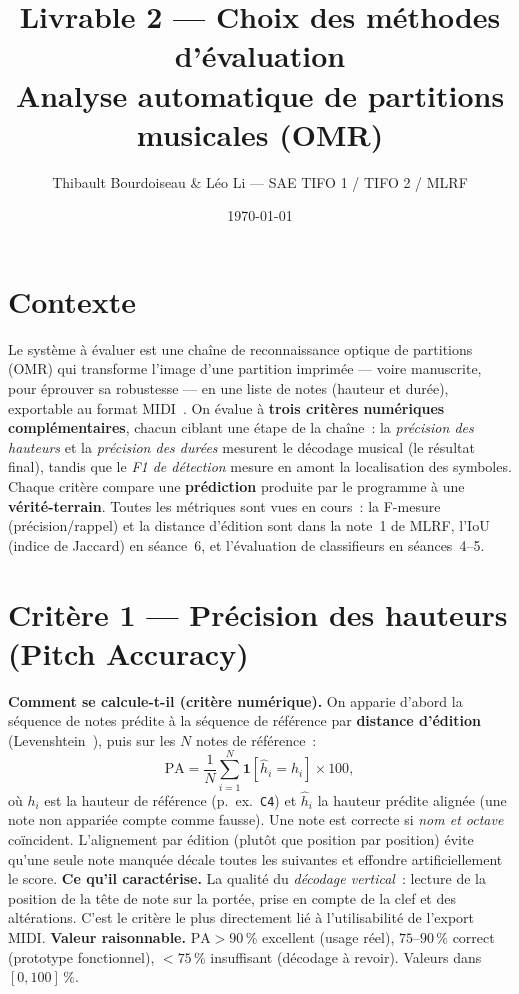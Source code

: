 \documentclass[11pt,a4paper]{article}
\title{\vspace{-1.2cm}\textbf{Livrable 2 --- Choix des méthodes d'évaluation\\[2pt]
\large Analyse automatique de partitions musicales (OMR)}}
\author{\normalsize Thibault Bourdoiseau \& Léo Li --- SAE TIFO 1 / TIFO 2 / MLRF}
\date{\vspace{-8pt}\small \today}
\begin{document}
\maketitle
\vspace{-10pt}

\section{Contexte}
Le système à évaluer est une chaîne de reconnaissance optique de partitions (OMR) qui transforme l'image
d'une partition imprimée --- voire manuscrite, pour éprouver sa robustesse --- en une liste de notes
(hauteur et durée), exportable au format MIDI~\cite{calvo2020,rebelo2012}. On évalue à \textbf{trois critères numériques complémentaires}, chacun
ciblant une étape de la chaîne~: la \emph{précision des hauteurs} et la \emph{précision des durées} mesurent
le décodage musical (le résultat final), tandis que le \emph{F1 de détection} mesure en amont la localisation
des symboles. Chaque critère compare une \textbf{prédiction} produite par le programme à une
\textbf{vérité-terrain}. Toutes les métriques sont vues en cours~: la F-mesure (précision/rappel) et la
distance d'édition sont dans la note~1 de MLRF, l'IoU (indice de Jaccard) en séance~6, et l'évaluation de
classifieurs en séances~4--5.

\section{Critère 1 --- Précision des hauteurs (Pitch Accuracy)}
\textbf{Comment se calcule-t-il (critère numérique).} On apparie d'abord la séquence de notes prédite à la
séquence de référence par \textbf{distance d'édition} (Levenshtein~\cite{levenshtein1966}), puis sur les
$N$ notes de référence~:
\[
\mathrm{PA} = \frac{1}{N}\sum_{i=1}^{N}\mathbf{1}\!\left[\hat h_i = h_i\right]\times 100,
\]
où $h_i$ est la hauteur de référence (p.~ex.\ \texttt{C4}) et $\hat h_i$ la hauteur prédite alignée (une note
non appariée compte comme fausse). Une note est correcte si \emph{nom et octave} coïncident. L'alignement par
édition (plutôt que position par position) évite qu'une seule note manquée décale toutes les suivantes et
effondre artificiellement le score.
\textbf{Ce qu'il caractérise.} La qualité du \emph{décodage vertical}~: lecture de la position de la tête de
note sur la portée, prise en compte de la clef et des altérations. C'est le critère le plus directement lié à
l'utilisabilité de l'export MIDI.
\textbf{Valeur raisonnable.} $\mathrm{PA}>90\,\%$ excellent (usage réel), $75\text{--}90\,\%$ correct
(prototype fonctionnel), $<75\,\%$ insuffisant (décodage à revoir). Valeurs dans $[0,100]\,\%$.
\end{document}
